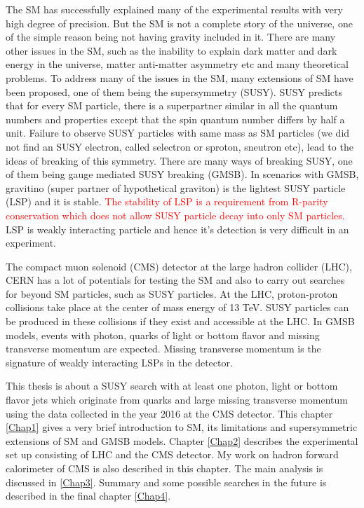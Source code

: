 The SM has successfully explained many of the experimental results with very high degree of precision. But the SM is not a complete story of the universe, one of the simple reason being not having gravity included in it. There are many other issues in the SM, such as the inability to explain dark matter and dark energy in the universe, matter anti-matter asymmetry etc and many theoretical problems. To address many of the issues in the SM, many extensions of SM have been proposed, one of them being the supersymmetry (SUSY). SUSY predicts that for every SM particle, there is a superpartner similar in all the quantum numbers and properties except that the spin quantum number differs by half a unit. Failure to observe SUSY particles with same mass as SM particles (we did not find an SUSY electron, called selectron or sproton, sneutron etc), lead to the ideas of breaking of this symmetry. There are many ways of breaking SUSY, one of them being gauge mediated SUSY breaking (GMSB). In scenarios with GMSB, gravitino (super partner of hypothetical graviton) is the lightest SUSY particle (LSP) and it is stable. \textcolor{red}{The stability of LSP is a requirement from R-parity conservation which does not allow SUSY particle decay into only SM particles.} LSP is weakly interacting particle and hence it's detection is very difficult in an experiment.

The compact muon solenoid (CMS) detector at the large hadron collider (LHC), CERN has a lot of potentials for testing the SM and also to carry out searches for beyond SM particles, such as SUSY particles. At the LHC, proton-proton collisions take place at the center of mass energy of 13 TeV. SUSY particles can be produced in these collisions if they exist and accessible at the LHC. In GMSB models, events with photon, quarks of light or bottom flavor and missing transverse momentum are expected. Missing transverse momentum is the signature of weakly interacting LSPs in the detector.

This thesis is about a SUSY search with at least one photon, light or bottom flavor jets which originate from quarks and large missing transverse momentum using the data collected in the year 2016 at the CMS detector. This chapter \ref{Chap1} gives a very brief introduction to SM, its limitations and supersymmetric extensions of SM and GMSB models. Chapter \ref{Chap2} describes the experimental set up consisting of LHC and the CMS detector. My work on hadron forward calorimeter of CMS is also described in this chapter.  The main analysis is discussed in \ref{Chap3}. Summary and some possible searches in the future is described in the final chapter \ref{Chap4}.


